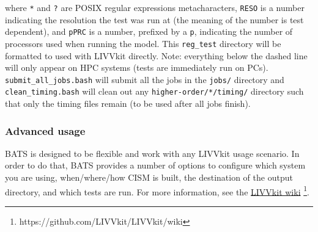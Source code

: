 \noindent
where \texttt{*} and \texttt{?} are POSIX regular expressions metacharacters, \texttt{RESO} is a number indicating the
resolution the test was run at (the meaning of the number is test dependent), and \texttt{pPRC} is a number, prefixed by
a \texttt{p}, indicating the number of processors used when running the model. This \texttt{reg\_test} directory will be
formatted to used with LIVVkit directly. Note: everything below the dashed line will only appear on HPC systems (tests
are immediately run on PCs).  \texttt{submit\_all\_jobs.bash} will submit all the jobs in the \texttt{jobs/} directory
and \texttt{clean\_timing.bash} will clean out any \texttt{higher-order/*/timing/} directory such that only the timing
files remain (to be used after all jobs finish).

\subsubsection{Advanced usage}
    
BATS is designed to be flexible and work with any LIVVkit usage scenario. In order to do that, BATS provides a number of
options to configure which system you are using, when/where/how CISM is built, the destination of the output directory,
and which tests are run. For more information, see the \href{https://github.com/LIVVkit/LIVVkit/wiki}{LIVVkit wiki}
\footnote{https://github.com/LIVVkit/LIVVkit/wiki}. 



